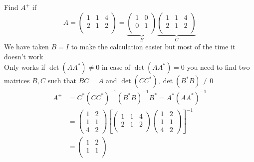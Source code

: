 \begin{example}
    Find $A^{+}$ if
    \[
        A = \begin{pmatrix}
            1 & 1 & 4 \\
            2 & 1 & 2 \\
        \end{pmatrix}
        =
        \underbrace{
            \begin{pmatrix}
                1 & 0 \\
                0 & 1 \\
            \end{pmatrix}
        }_B
        \underbrace{
            \begin{pmatrix}
                1 & 1 & 4 \\
                2 & 1 & 2 \\
            \end{pmatrix}
        }_C
    \]
    We have taken $B = I$ to make the calculation easier but most of the time it doesn't work
    \\
    Only works if $\det(AA^{*}) \neq 0$ in case of $\det(AA^{*}) = 0$ you need to find two matrices $B,C$ such that
    $BC = A$ and $\det(CC^{*}) , \det(B^{*}B) \neq 0$
    \begin{align*}
        A^{+}  & =  C^{*}(CC^{*})^{-1} (B^{*}B)^{-1}B^{*} =  A^{*}(AA^{*})^{-1}
        \\
               & =
        \begin{pmatrix}
            1 & 2 \\
            1 & 1 \\
            4 & 2
        \end{pmatrix}
        \left[
            \begin{pmatrix}
                1 & 1 & 4 \\
                2 & 1 & 2 \\
            \end{pmatrix}
            \begin{pmatrix}
                1 & 2 \\
                1 & 1 \\
                4 & 2
            \end{pmatrix}
            \right]^{-1}
        \\
               & =
        \begin{pmatrix}
            1 & 2 \\
            1 & 1 \\

\end{pmatrix}
\end{align*}
\end{example}
